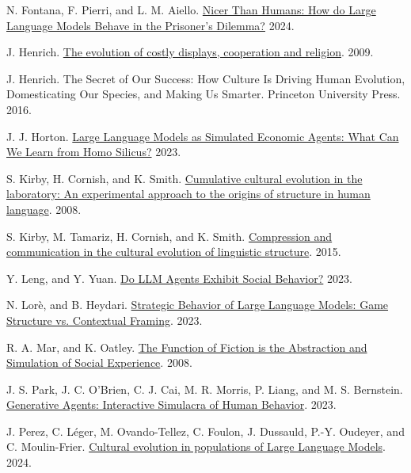 \documentclass[
  10pt,
  letterpaper,
]{article}
\newlength{\cslhangindent}
\newenvironment{CSLReferences}[2] %
 {\begin{list}{}{%
  \setlength{\itemindent}{0pt}
  \setlength{\leftmargin}{0pt}
  \setlength{\parsep}{0pt}
  \ifodd #1
   \setlength{\leftmargin}{\cslhangindent}
   \setlength{\itemindent}{-1\cslhangindent}
  \fi
  \setlength{\itemsep}{#2\baselineskip}}}
 {\end{list}}
\begin{document}
\begin{CSLReferences}{1}{0}
N. Fontana, F. Pierri, and L. M. Aiello.
\href{https://doi.org/10.48550/ARXIV.2406.13605}{Nicer Than Humans: How
do Large Language Models Behave in the Prisoner's Dilemma?} 2024.

J. Henrich.
\href{https://doi.org/10.1016/j.evolhumbehav.2009.03.005}{The evolution
of costly displays, cooperation and religion}. 2009.

J. Henrich. The Secret of Our Success: How Culture Is Driving Human
Evolution, Domesticating Our Species, and Making Us Smarter. Princeton
University Press. 2016.

J. J. Horton. \href{https://doi.org/10.3386/w31122}{Large Language
Models as Simulated Economic Agents: What Can We Learn from Homo
Silicus?} 2023.

S. Kirby, H. Cornish, and K. Smith.
\href{https://doi.org/10.1073/pnas.0707835105}{Cumulative cultural
evolution in the laboratory: An experimental approach to the origins of
structure in human language}. 2008.

S. Kirby, M. Tamariz, H. Cornish, and K. Smith.
\href{https://doi.org/10.1016/j.cognition.2015.03.016}{Compression and
communication in the cultural evolution of linguistic structure}. 2015.

Y. Leng, and Y. Yuan.
\href{https://doi.org/10.48550/ARXIV.2312.15198}{Do LLM Agents Exhibit
Social Behavior?} 2023.

N. Lorè, and B. Heydari.
\href{https://doi.org/10.48550/ARXIV.2309.05898}{Strategic Behavior of
Large Language Models: Game Structure vs. Contextual Framing}. 2023.

R. A. Mar, and K. Oatley.
\href{https://doi.org/10.1111/j.1745-6924.2008.00073.x}{The Function of
Fiction is the Abstraction and Simulation of Social Experience}. 2008.

J. S. Park, J. C. O'Brien, C. J. Cai, M. R. Morris, P. Liang, and M. S.
Bernstein. \href{https://doi.org/10.48550/ARXIV.2304.03442}{Generative
Agents: Interactive Simulacra of Human Behavior}. 2023.

J. Perez, C. Léger, M. Ovando-Tellez, C. Foulon, J. Dussauld, P.-Y.
Oudeyer, and C. Moulin-Frier.
\href{https://doi.org/10.48550/ARXIV.2403.08882}{Cultural evolution in
populations of Large Language Models}. 2024.


\end{CSLReferences}
\end{document}
